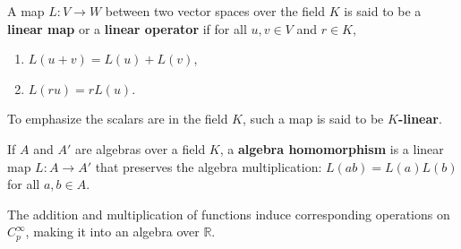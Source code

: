 \documentclass[en, oneside]{vivi}
\begin{document}
\begin{dfn}
    A map $L: V \to W$ between two vector spaces over the field $K$ is said to be a \textbf{linear map} or a \textbf{linear operator} if for all $u, v \in V$ and $r \in K$,
    \begin{enumerate}[label=(\roman*)]
        \item $L(u + v) = L(u) + L(v)$,
        \item $L(r u) = r L(u)$.
    \end{enumerate}
    To emphasize the scalars are in the field $K$, such a map is said to be \textbf{$K$-linear}.
\end{dfn}
\begin{dfn}
    If $A$ and $A'$ are algebras over a field $K$, a \textbf{algebra homomorphism} is a linear map $L: A \to A'$ that preserves the algebra multiplication: $L(ab) = L(a)L(b)$ for all $a, b \in A$.
\end{dfn}
The addition and multiplication of functions induce corresponding operations on $C_p^\infty$, making it into an algebra over $\mathbb{R}$.
\end{document}
